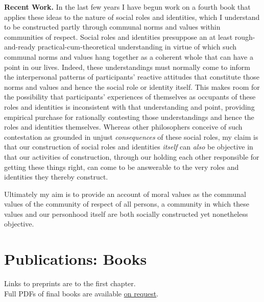 \documentclass[11pt]{article}
\makeatletter
\newcommand{\onrequest}{\href{mailto:bhelm@fandm.edu}{on request}}
\makeatother
\begin{document}
\noindent\textbf{Recent Work.}
In the last few years I have begun work on a fourth book that applies these ideas to the nature of social roles and identities, which I understand to be constructed partly through communal norms and values within communities of respect. Social roles and identities presuppose an at least rough-and-ready practical-cum-theoretical understanding in virtue of which such communal norms and values hang together as a coherent whole that can have a point in our lives. Indeed, these understandings must normally come to inform the interpersonal patterns of participants' reactive attitudes that constitute those norms and values and hence the social role or identity itself. This makes room for the possibility that participants' experiences of themselves as occupants of these roles and identities is inconsistent with that understanding and point, providing empirical purchase for rationally contesting those understandings and hence the roles and identities themselves. Whereas other philosophers conceive of such contestation as grounded in unjust \emph{consequences} of these social roles, my claim is that our construction of social roles and identities \emph{itself} can \emph{also} be objective in that our activities of construction, through our holding each other responsible for getting these things right, can come to be answerable to the very roles and identities they thereby construct.

\bigskip{}

Ultimately my aim is to provide an account of moral values as the communal values of the community of respect of all persons, a community in which these values and our personhood itself are both socially constructed yet nonetheless objective.


\section[Books]{Publications: Books}

\newrefsection

\begin{center}
  Links to preprints are to the first chapter.\\
  Full PDFs of final books are available \onrequest{}.\\
  ~
\end{center}
\end{document}
